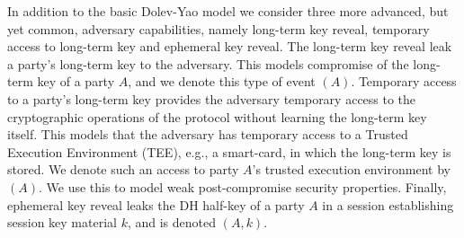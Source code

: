 In addition to the basic Dolev-Yao model we consider three more advanced, but
yet common, adversary capabilities, namely long-term key reveal, temporary
access to long-term key and ephemeral key reveal.
%
The long-term key reveal leak a party's long-term key to the adversary.
%
This models compromise of the long-term key of a party $A$, and we denote this
type of event \mRevLTK$(A)$.
%
Temporary access to a party's long-term key provides the adversary temporary
access to the cryptographic operations of the protocol without learning the
long-term key itself.
%
This models that the adversary has temporary access to a Trusted Execution
Environment (TEE), e.g., a smart-card, in which the long-term key is stored.
%
We denote such an access to party $A$'s trusted execution environment by
\mTEE$(A)$.
%
We use this to model weak post-compromise security properties.
%
Finally, ephemeral key reveal leaks the DH half-key of a party $A$ in a session
establishing session key material $k$, and is denoted \mRevEph$(A, k)$.
%

